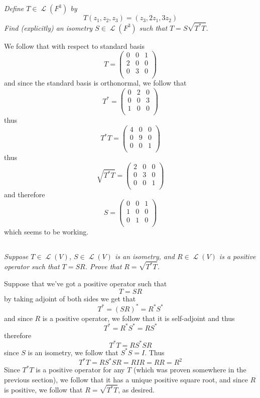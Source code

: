 \documentclass[11pt,oneside,titlepage]{book}
\DeclareMathOperator \map {\mathcal {L}}
\begin{document}
\subsection{}

\textit{Define $T \in \map(F^3)$ by
$$T(z_1, z_2, z_3) = (z_3, 2z_1, 3z_2)$$
Find (explicitly) an isometry $S \in \map(F^3)$ such that $T = S \sqrt{T^* T}$.}

We follow that with respect to standard basis
$$
T =
\begin{pmatrix}
  0 & 0 & 1 \\
  2 & 0 & 0 \\
  0 & 3 & 0 \\
\end{pmatrix}
$$
and since the standard basis is orthonormal, we follow that 
$$
T^* =
\begin{pmatrix}
  0 & 2 & 0 \\
  0 & 0 & 3 \\
  1 & 0 & 0 \\
\end{pmatrix}
$$
thus
$$T^* T =
\begin{pmatrix}
  4 & 0 & 0 \\
  0 & 9 & 0 \\
  0 & 0 & 1 \\
\end{pmatrix}
$$
thus
$$\sqrt{T^* T} =
\begin{pmatrix}
  2 & 0 & 0 \\
  0 & 3 & 0 \\
  0 & 0 & 1 \\
\end{pmatrix}
$$
and therefore
$$ S = 
\begin{pmatrix}
  0 & 0 & 1 \\
  1 & 0 & 0 \\
  0 & 1 & 0 \\
\end{pmatrix}
$$
which seems to be working.

\subsection{}

\textit{Suppose $T \in \map(V)$, $S \in \map(V)$ is an isometry, and $R \in \map(V)$ is a
  positive operator such that $T = SR$. Prove that $R = \sqrt{T^* T}$.}

Suppose that we've got a positive operator such that 
$$T = S R$$
by taking adjoint of both sides we get that
$$T^* = (S R)^* = R^* S^*$$
and since $R$ is a positive operator, we follow that it is self-adjoint and thus
$$T^* = R^* S^* = R S^*$$
therefore
$$T^* T = R S^* S R$$
since $S$ is an isometry, we follow that $S^* S = I$. Thus
$$T^* T = R S^* S R = R I R = RR = R^2$$
Since $T^* T$ is a positive operator for any $T$ (which was proven somewhere in the previous
section), we follow that it has a unique positive square root,
and since $R$ is positive, we follow that $R = \sqrt{T^* T}$, as desired.
\end{document}
